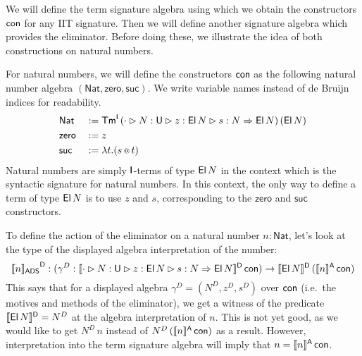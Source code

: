 \documentclass[a4paper,UKenglish,cleveref, autoref]{lipics-v2019}
\begin{document}
We will define the term signature algebra using which we obtain the
constructors $\mathsf{con}$ for any IIT signature. Then we will define another
signature algebra which provides the eliminator. Before doing these,
we illustrate the idea of both constructions on natural numbers.
\begin{example}\label{eg:nat_con}
  For natural numbers, we will define the constructors $\mathsf{con}$ as the
  following natural number algebra
  $(\mathsf{Nat},\mathsf{zero},\mathsf{suc})$. We write variable names
  instead of de Bruijn indices for readability.
  \begin{alignat*}{5}
    & \mathsf{Nat} && := \mathsf{Tm}^{\mathsf{I}}\,(\cdot\rhd N:\mathsf{U}\rhd z:\mathsf{El}\,N\rhd s:N\Rightarrow\mathsf{El}\,N)\,(\mathsf{El}\,N) \\
    & \mathsf{zero} && := z \\
    & \mathsf{suc} && := \lambda t. (s\mathop{{\scriptstyle @}} t)
  \end{alignat*}
  Natural numbers are simply $\mathsf{I}$-terms of type $\mathsf{El}\,N$ in the
  context which is the syntactic signature for natural numbers. In
  this context, the only way to define a term of type $\mathsf{El}\,N$ is to
  use $z$ and $s$, corresponding to the $\mathsf{zero}$ and
  $\mathsf{suc}$ constructors.

  To define the action of the eliminator on a natural number
  $n : \mathsf{Nat}$, let's look at the type of the displayed algebra
  interpretation of the number:
  \[
    {\llbracket n \rrbracket_{\mathsf{ADS}}}^{\mathsf{D}} : (\gamma^D : \llbracket\cdot\rhd N:\mathsf{U}\rhd z:\mathsf{El}\,N\rhd s:N\Rightarrow\mathsf{El}\,N\rrbracket^{\mathsf{D}}\,\mathsf{con}) \rightarrow \llbracket\mathsf{El}\,N\rrbracket^{\mathsf{D}}\,(\llbracket n\rrbracket^{\mathsf{A}}\,\mathsf{con})
  \]
  This says that for a displayed algebra $\gamma^D=(N^D,z^D,s^D)$ over
  $\mathsf{con}$ (i.e.\ the motives and methods of the eliminator), we get a
  witness of the predicate $\llbracket\mathsf{El}\,N\rrbracket^{\mathsf{D}} = N^D$ at the algebra
  interpretation of $n$. This is not yet good, as we would like to get
  $N^D\,n$ instead of $N^D\,(\llbracket n\rrbracket^{\mathsf{A}}\,\mathsf{con})$ as a result. However,
  interpretation into the term signature algebra will imply that
  $n = \llbracket n\rrbracket^{\mathsf{A}}\,\mathsf{con}$.
\end{example}
\end{document}
